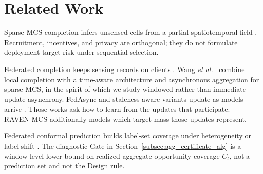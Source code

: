 \documentclass[letterpaper,journal]{IEEEtran}
\begin{document}
\section{Related Work}
\label{sec:related_work}

Sparse MCS completion infers unsensed cells from a partial spatiotemporal
field
\cite{ganti2011mobile,guo2015mobile,ma2014opportunities,wang2023spatiotemporal,wang2023outlier,wang2023transformer,wang2024fewshot,li2024robust,wang2025evolutionary,xu2025rethinking,liu2026pyramid,zhang2026mapt,liu2026pricing}.
Recruitment, incentives, and privacy
\cite{liu2026multidimensional,zhang2025incentive,lu2025piece,zhang2026locally}
are orthogonal; they do not formulate deployment-target risk under sequential
selection.

Federated completion keeps sensing records on clients
\cite{mcmahan2017communication,yang2019federated,kairouz2021advances,li2020federated}.
Wang \emph{et al.}~\cite{wang2026federated} combine local completion with a
time-aware architecture and asynchronous aggregation for sparse MCS, in the
spirit of which we study windowed rather than immediate-update asynchrony.
FedAsync and staleness-aware variants update as models arrive
\cite{xie2019asynchronous,liu2023adaptive,sun2024staleness,islam2025seafl,li2026stdfl}.
Those works ask how to learn from the updates that participate.  RAVEN-MCS
additionally models which target mass those updates represent.

Federated conformal prediction builds label-set coverage under
heterogeneity or label shift
\cite{lu2023federated,plassier2023conformal}.  The diagnostic Gate in
Section~\ref{subsec:agg_certificate_alg} is a window-level lower bound on
realized aggregate opportunity coverage $C_t$, not a prediction set and
not the Design rule.
\end{document}
